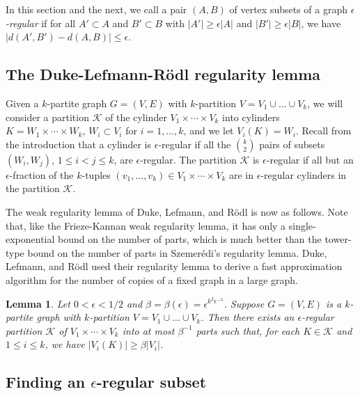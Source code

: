 \documentclass[11pt]{article}
\newtheorem{lemma}{Lemma}[section]
\begin{document}
 In this section and the next, we call a pair $(A,B)$ of vertex subsets of a graph {\it
$\epsilon$-regular} if for all $A' \subset A$ and $B' \subset B$ with $|A'|
\geq \epsilon|A|$ and $|B'| \geq \epsilon |B|$, we have
$\left|d(A',B')-d(A,B)\right| \leq \epsilon$.



\subsection{The Duke-Lefmann-R\"odl regularity lemma} \label{inducedsub2}


Given a $k$-partite graph $G=(V,E)$ with $k$-partition $V=V_1 \cup \ldots \cup
V_k$, we will consider a partition $\mathcal{K}$ of the cylinder $V_1 \times
\cdots \times V_k$ into cylinders $K=W_1 \times \cdots \times W_k$, $W_i
\subset V_i$ for $i=1,\ldots,k$, and we let $V_i(K)=W_i$.  Recall from the
introduction that a cylinder is $\epsilon$-regular if all the ${k \choose 2}$
pairs of subsets $(W_i,W_j)$, $1 \leq i < j \leq k$, are $\epsilon$-regular.
The partition $\mathcal{K}$ is $\epsilon$-regular if all but an
$\epsilon$-fraction of the $k$-tuples $(v_1,\ldots,v_k) \in V_1 \times \cdots
\times V_k$ are in $\epsilon$-regular cylinders in the partition $\mathcal{K}$.

The weak regularity lemma of Duke, Lefmann, and R\"odl \cite{DLR} is now as
follows. Note that, like the Frieze-Kannan weak regularity lemma, it has only a
single-exponential bound on the number of parts, which is much better than the
tower-type bound on the number of parts in Szemer\'edi's regularity lemma.
Duke, Lefmann, and R\"odl \cite{DLR} used their regularity lemma to derive a
fast approximation algorithm for the number of copies of a fixed graph in a
large graph.

\begin{lemma}\label{dukelefrod}
Let $0<\epsilon<1/2$ and $\beta=\beta(\epsilon)=\epsilon^{k^2\epsilon^{-5}}$.
Suppose $G=(V, E)$ is a $k$-partite graph with $k$-partition $V=V_1 \cup \ldots
\cup V_k$. Then there exists an $\epsilon$-regular partition $\mathcal{K}$ of
$V_1 \times \cdots \times V_k$ into at most $\beta^{-1}$ parts such that, for
each $K \in \mathcal{K}$ and $1 \leq i \leq k$, we have $|V_i(K)| \geq
\beta|V_i|$.
\end{lemma}

\subsection{Finding an $\epsilon$-regular subset}
\end{document}
